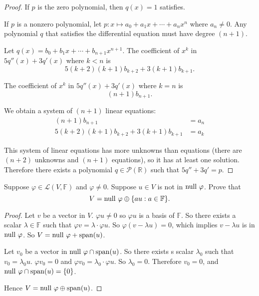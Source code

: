 \begin{proof}
    If $p$ is the zero polynomial, then $q(x) = 1$ satisfies.

    If $p$ is a nonzero polynomial, let $p: x\mapsto a_{0} + a_{1}x + \cdots + a_{n}x^{n}$ where $a_{n}\ne 0$. Any polynomial $q$ that satisfies the differential equation must have degree $(n+1)$.

    Let $q(x) = b_{0} + b_{1}x + \cdots + b_{n+1}x^{n+1}$. The coefficient of $x^{k}$ in $5q''(x) + 3q'(x)$ where $k < n$ is
    \[
        5(k+2)(k+1)b_{k+2} + 3(k+1)b_{k+1}.
    \]

    The coefficient of $x^{k}$ in $5q''(x) + 3q'(x)$ where $k = n$ is
    \[
        (n+1)b_{n+1}.
    \]

    We obtain a system of $(n+1)$ linear equations:
    \begin{align*}
        (n+1)b_{n+1}                       & = a_{n} \\
        5(k+2)(k+1)b_{k+2} + 3(k+1)b_{k+1} & = a_{k}
    \end{align*}

    This system of linear equations has more unknowns than equations (there are $(n+2)$ unknowns and $(n+1)$ equations), so it has at least one solution. Therefore there exists a polynomial $q\in\mathcal{P}(\mathbb{R})$ such that $5q'' + 3q' = p$.
\end{proof}
\newpage

\begin{exercise}\label{chapter3:sectionB:exercise30}
    Suppose $\varphi \in \mathcal{L}(V, \mathbb{F})$ and $\varphi \ne 0$. Suppose $u \in V$ is not in $\operatorname{null}\,{\varphi}$. Prove that
    \[
        V = \operatorname{null}\,{\varphi} \oplus \{ au : a\in\mathbb{F} \}.
    \]
\end{exercise}

\begin{proof}
    Let $v$ be a vector in $V$. $\varphi u\ne 0$ so $\varphi u$ is a basis of $\mathbb{F}$. So there exists a scalar $\lambda\in\mathbb{F}$ such that $\varphi v = \lambda\cdot \varphi u$. So $\varphi(v - \lambda u) = 0$, which implies $v - \lambda u$ is in $\operatorname{null}\,{\varphi}$. So $V = \operatorname{null}\,{\varphi} + \operatorname{span}(u)$.

    Let $v_{0}$ be a vector in $\operatorname{null}\,{\varphi}\cap\operatorname{span}(u)$. So there exists s scalar $\lambda_{0}$ such that $v_{0} = \lambda_{0}u$. $\varphi v_{0} = 0$ and $\varphi v_{0} = \lambda_{0}\cdot \varphi u$. So $\lambda_{0} = 0$. Therefore $v_{0} = 0$, and $\operatorname{null}\,{\varphi}\cap\operatorname{span}(u) = \{0\}$.

    Hence $V = \operatorname{null}\,{\varphi} \oplus \operatorname{span}(u)$.
\end{proof}
\newpage

